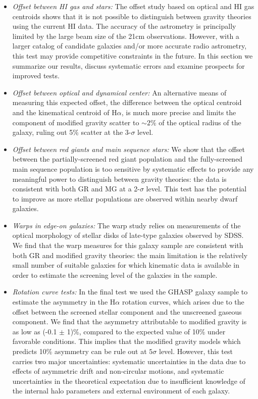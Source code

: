 \documentclass[twocolappendix, numberedappendix]{emulateapj}
\newcommand{\ha}{H$\alpha$}
\begin{document}
\begin{itemize}
\item {\it Offset between HI gas and stars:}
The offset study based on optical and HI gas centroids shows that it is not
possible to distinguish between gravity theories using the current HI data. 
The accuracy of the astrometry is principally limited by the large beam size of
the 21cm observations.  However, with a larger catalog of candidate
galaxies and/or more accurate radio astrometry, this test may provide
competitive constraints in the future. In this section we summarize our results, 
discuss systematic errors and examine prospects for improved tests. 

\item {\it Offset between optical and dynamical center:}
An alternative means of measuring this expected offset, the difference
between the optical centroid and the kinematical centroid of \ha{}, is
much more precise and limits the component of modified gravity scatter
to  $\sim 2$\% of the optical radius of the galaxy, ruling out 5\%
scatter at the 3-$\sigma$ level.

\item {\it Offset between red giants and main sequence stars:}
We show that the offset between the partially-screened red giant
population and the fully-screened main sequence population is too
sensitive by systematic effects to provide any meaningful power to distinguish
between gravity theories: the data is consistent with both GR and MG at
a 2-$\sigma$ level.  This test has the potential to improve as more stellar
populations are observed within nearby dwarf galaxies.

\item {\it Warps in edge-on galaxies:}
The warp study relies on measurements of the optical morphology of stellar
disks of late-type galaxies observed by SDSS.
We find that the warp measures for this galaxy sample are
consistent with both GR and modified gravity theories: the main limitation
is the relatively small number of suitable galaxies for which kinematic data
is available in order to estimate the screening level of the galaxies in
the sample.   

\item {\it Rotation curve tests: }
In the final test we used the GHASP galaxy sample to estimate
the asymmetry in the \ha{} rotation curves, which arises due to the
offset between the screened stellar component and the unscreened gaseous
component. We find that the asymmetry attributable to modified gravity is as
low as (-0.1 $\pm$ 1)\%, compared to the expected value of 10\% under
favorable conditions.
This implies that the modified gravity models which predicts 10\%
asymmetry can be rule out at $5 \sigma$ level. However, this test carries two
major uncertainties: systematic uncertainties in the data due to effects of
asymmetric drift and non-circular motions, and systematic uncertainties in
the theoretical expectation due to insufficient knowledge of the internal
halo parameters and external environment of each galaxy.
\end{itemize}
\end{document}
